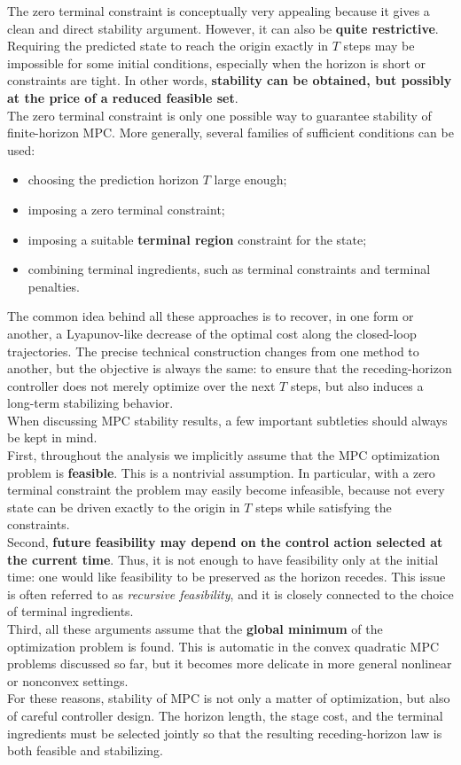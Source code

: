 The zero terminal constraint is conceptually very appealing because it gives a clean and direct stability argument. However, it can also be \textbf{quite restrictive}. Requiring the predicted state to reach the origin exactly in $T$ steps may be impossible for some initial conditions, especially when the horizon is short or constraints are tight. In other words, \textbf{stability can be obtained, but possibly at the price of a reduced feasible set}.\\

The zero terminal constraint is only one possible way to guarantee stability of finite-horizon MPC. More generally, several families of sufficient conditions can be used:
\begin{itemize}
    \item choosing the prediction horizon $T$ large enough;
    \item imposing a zero terminal constraint;
    \item imposing a suitable \textbf{terminal region} constraint for the state;
    \item combining terminal ingredients, such as terminal constraints and terminal penalties.
\end{itemize}
The common idea behind all these approaches is to recover, in one form or another, a Lyapunov-like decrease of the optimal cost along the closed-loop trajectories. The precise technical construction changes from one method to another, but the objective is always the same: to ensure that the receding-horizon controller does not merely optimize over the next $T$ steps, but also induces a long-term stabilizing behavior.\\

When discussing MPC stability results, a few important subtleties should always be kept in mind.\\
First, throughout the analysis we implicitly assume that the MPC optimization problem is \textbf{feasible}. This is a nontrivial assumption. In particular, with a zero terminal constraint the problem may easily become infeasible, because not every state can be driven exactly to the origin in $T$ steps while satisfying the constraints.\\
Second, \textbf{future feasibility may depend on the control action selected at the current time}. Thus, it is not enough to have feasibility only at the initial time: one would like feasibility to be preserved as the horizon recedes. This issue is often referred to as \emph{recursive feasibility}, and it is closely connected to the choice of terminal ingredients.\\
Third, all these arguments assume that the \textbf{global minimum} of the optimization problem is found. This is automatic in the convex quadratic MPC problems discussed so far, but it becomes more delicate in more general nonlinear or nonconvex settings.\\
For these reasons, stability of MPC is not only a matter of optimization, but also of careful controller design. The horizon length, the stage cost, and the terminal ingredients must be selected jointly so that the resulting receding-horizon law is both feasible and stabilizing.

